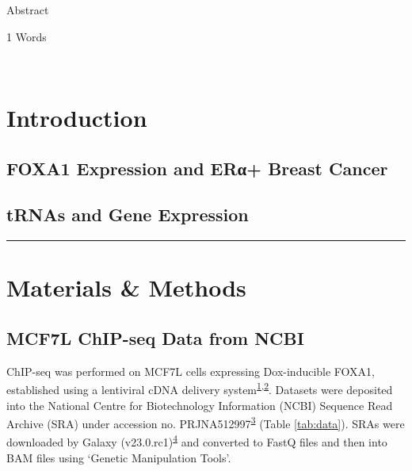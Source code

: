 \documentclass[
  11pt,
]{article}
\begin{document}
Abstract

\normalsize
\begin{flushright}
1 Words
\end{flushright}
\hrulefill\\
\setlength{\parindent}{10pt}

\hypertarget{introduction}{%
\section{Introduction}\label{introduction}}

\hypertarget{foxa1-expression-and-erux3b1-breast-cancer}{%
\subsection{FOXA1 Expression and ERα+ Breast Cancer}\label{foxa1-expression-and-erux3b1-breast-cancer}}

\hypertarget{trnas-and-gene-expression}{%
\subsection{tRNAs and Gene Expression}\label{trnas-and-gene-expression}}

\begin{center}\rule{0.5\linewidth}{0.5pt}\end{center}

\hypertarget{materials-methods}{%
\section{Materials \& Methods}\label{materials-methods}}

\hypertarget{mcf7l-chip-seq-data-from-ncbi}{%
\subsection{MCF7L ChIP-seq Data from NCBI}\label{mcf7l-chip-seq-data-from-ncbi}}

ChIP-seq was performed on MCF7L cells expressing Dox-inducible FOXA1, established using a lentiviral cDNA delivery system\textsuperscript{\protect\hyperlink{ref-fu2016}{1},\protect\hyperlink{ref-fu2019}{2}}. Datasets were deposited into the National Centre for Biotechnology Information (NCBI) Sequence Read Archive (SRA) under accession no. PRJNA512997\textsuperscript{\protect\hyperlink{ref-leinonen2010}{3}} (Table \ref{tab:data}). SRAs were downloaded by Galaxy (v23.0.rc1)\textsuperscript{\protect\hyperlink{ref-thegala2022}{4}} and converted to FastQ files and then into BAM files using `Genetic Manipulation Tools'.
\end{document}
